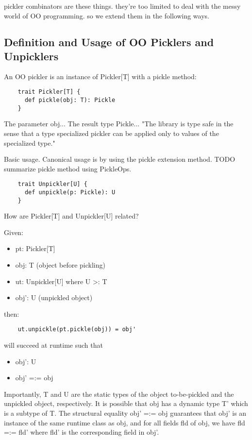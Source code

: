 \documentclass[preprint,10pt]{sigplanconf}
\begin{document}
pickler combinators are these things. they're too limited to deal with the messy world of OO programming. so we extend them in the following ways.

\subsection{Definition and Usage of OO Picklers and Unpicklers}

An OO pickler is an instance of Pickler[T] with a pickle method:

\begin{verbatim}
    trait Pickler[T] {
      def pickle(obj: T): Pickle
    }
\end{verbatim}

The parameter obj... The result type Pickle...
"The library is type safe in the sense that a type specialized pickler can be applied only to values of the specialized type."

Basic usage. Canonical usage is by using the pickle extension method. TODO summarize pickle method using PickleOps.

\begin{verbatim}
    trait Unpickler[U] {
      def unpickle(p: Pickle): U
    }
\end{verbatim}
How are Pickler[T] and Unpickler[U] related?

Given:
\begin{itemize}
  \item pt: Pickler[T]
  \item obj: T (object before pickling)
  \item ut: Unpickler[U] where U >: T
  \item obj': U (unpickled object)
\end{itemize}

then:

\begin{verbatim}
    ut.unpickle(pt.pickle(obj)) = obj'
\end{verbatim}

will succeed at runtime such that

\begin{itemize}
  \item obj': U
  \item obj' =:= obj
\end{itemize}

Importantly, T and U are the static types of the object to-be-pickled and the unpickled object, respectively. It is possible that obj has a dynamic type T' which is a subtype of T. The structural equality obj' =:= obj guarantees that obj' is an instance of the same runtime class as obj, and for all fields fld of obj, we have fld =:= fld' where fld' is the corresponding field in obj'.
\end{document}
